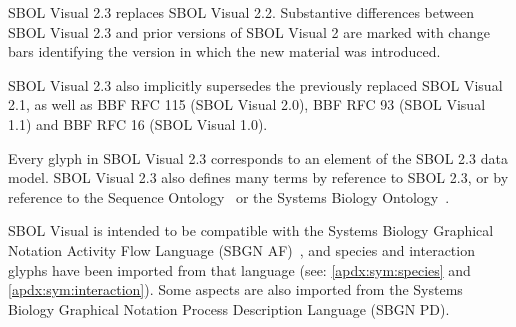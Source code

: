 
SBOL Visual 2.3 replaces SBOL Visual 2.2.
%
Substantive differences between SBOL Visual 2.3 and prior versions of SBOL Visual 2 are marked with change bars identifying the version in which the new material was introduced.

SBOL Visual 2.3 also implicitly supersedes the previously replaced SBOL Visual 2.1, as well as BBF RFC 115 (SBOL Visual 2.0), BBF RFC 93 (SBOL Visual 1.1) and BBF RFC 16 (SBOL Visual 1.0).

Every glyph in SBOL Visual 2.3 corresponds to an element of the SBOL 2.3 data model.
SBOL Visual 2.3 also defines many terms by reference to SBOL 2.3, 
or by reference to the Sequence Ontology~\citep{SequenceOntology}
or the Systems Biology Ontology~\citep{SBO}.

SBOL Visual is intended to be compatible with the Systems Biology Graphical Notation Activity Flow Language (SBGN AF)~\citep{sbgn}, 
and species and interaction glyphs have been imported from that language (see: \ref{apdx:sym:species} and \ref{apdx:sym:interaction}).
Some aspects are also imported from the Systems Biology Graphical Notation Process Description Language (SBGN PD).
